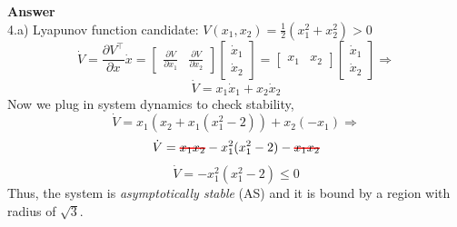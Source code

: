 \documentclass{homeworg}
\newcommand\hcancel[2][black]{\setbox0=\hbox{$#2$}%
\rlap{\raisebox{.45\ht0}{\textcolor{#1}{\rule{\wd0}{1pt}}}}#2}
\begin{document}
\noindent
\textbf{Answer} \\
4.a) Lyapunov function candidate: \( V(x_1, x_2) = \frac{1}{2} (x_1^2 + x_2^2) > 0\)
\begin{equation*}
\dot{V} = \frac{\partial V^\top}{\partial x} \dot{x} =
\begin{bmatrix}
\frac{\partial V}{\partial x_1} & \frac{\partial V}{\partial x_2}
\end{bmatrix}
\begin{bmatrix}
\dot{x}_1 \\
\dot{x}_2
\end{bmatrix}
=
\begin{bmatrix}
  x_1 & x_2
  \end{bmatrix}
  \begin{bmatrix}
  \dot{x}_1 \\
  \dot{x}_2
  \end{bmatrix}
  \Rightarrow
\end{equation*}
\begin{equation*}
\dot{V} =
  x_1 \dot{x}_1 + x_2 \dot{x}_2
\end{equation*}
Now we plug in system dynamics to check stability,
\begin{equation*}
  \dot{V} = x_1 (x_2 + x_1 (x_1^2 -2)) + x_2(-x_1) \Rightarrow
\end{equation*}
\begin{equation*}
  \dot{V} = \hcancel[red]{x_1 x_2} - x_1^2(x_1^2 -2) - \hcancel[red]{x_1 x_2}
\end{equation*}
\begin{equation*}
  \dot{V} = - x_1^2(x_1^2 -2) \leq 0
\end{equation*}
Thus, the system is \emph{asymptotically stable} (AS) and it is bound by a region
with radius of \(\sqrt{3}\).
\end{document}
